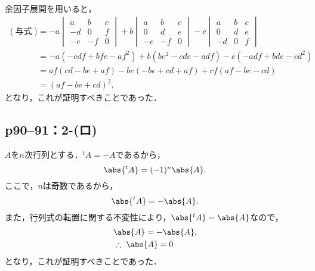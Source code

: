 \begin{tproof}
  余因子展開を用いると，
  \begin{align*}
    (\text{与式}) & = -a \begin{vmatrix} a & b & c \\ -d & 0 &f \\ -e & -f & 0 \end{vmatrix} +b \begin{vmatrix} a & b & c \\ 0 & d & e \\ -e & -f & 0 \end{vmatrix} -c \begin{vmatrix} a & b & c \\ 0 & d & e \\ -d & 0 & f \end{vmatrix} \\
                & = -a (-cdf +bfe-af^2)+b(be^2-cde-adf)-c(-adf+bde-cd^2)                                                                                                                                                                \\
                & = af (cd-be+af) -be(-be+cd+af) +cf(af-be-cd)                                                                                                                                                                          \\
                & = (af-be+cd)^2.
  \end{align*}
  となり，これが証明すべきことであった．
\end{tproof}

\subsection*{p90--91：2-(ロ)}

\begin{tproof}
  $A$を$n$次行列とする．${}^t A = -A$であるから，
  \[
    \abs{{}^t A}=(-1)^n\abs{A}.
  \]
  ここで，$n$は奇数であるから，
  \[
    \abs{{}^t A}=-\abs{A}.
  \]
  また，行列式の転置に関する不変性により，$\abs{{}^t A}=\abs{A}$なので，
  \begin{align*}
     & \abs{A}=-\abs{A} ,     \\
     & \therefore ~ \abs{A}=0
  \end{align*}
  となり，これが証明すべきことであった．
\end{tproof}


